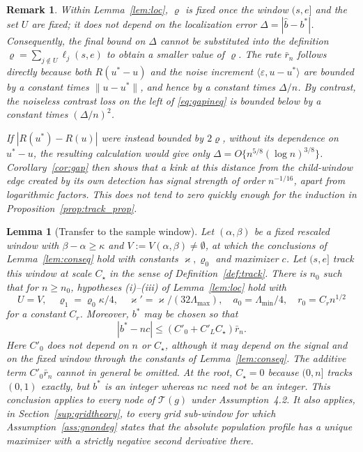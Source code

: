 \documentclass[12pt, a4paper]{article}
\newtheorem{lemma}{Lemma}[section]
\newtheorem{remark}{Remark}[section]
\newcommand{\assnondeg}{Assumption~4.2}
\begin{document}
\begin{remark}
\label{rem:fixedpoint}
Within Lemma~\ref{lem:loc}, $\varrho$ is fixed once the window $(s,e]$ and the
set $U$ are fixed; it does not depend on the localization error
$\Delta=|\hat b-b^*|$. Consequently, the final bound on $\Delta$ cannot be
substituted into the definition
$\varrho=\sum_{j\notin U}\ell_j(s,e)$ to obtain a smaller value of $\varrho$.
The rate $\bar r_n$ follows directly because both
$R(u^*-u)$ and the noise increment
$\langle\varepsilon,u-u^*\rangle$ are bounded by a constant times
$\|u-u^*\|$, and hence by a constant times $\Delta/n$. By contrast, the
noiseless contrast loss on the left of \eqref{eq:gapineq} is bounded below by
a constant times $(\Delta/n)^2$.

If $|R(u^*)-R(u)|$ were instead bounded by $2\varrho$, without its dependence
on $u^*-u$, the resulting calculation would give only
$\Delta=O\{n^{5/8}(\log n)^{3/8}\}$. Corollary~\ref{cor:gap} then shows that a
kink at this distance from the child-window edge created by its own detection
has signal strength of order $n^{-1/16}$, apart from logarithmic factors. This
does not tend to zero quickly enough for the induction in
Proposition~\ref{prop:track_prop}.
\end{remark}

\begin{lemma}[Transfer to the sample window]
\label{lem:transfer}
Let $(\alpha,\beta)$ be a fixed rescaled window with
$\beta-\alpha\ge\kappa$ and $V:=V(\alpha,\beta)\ne\emptyset$, at which the
conclusions of Lemma~\ref{lem:conseq} hold with constants
$\varkappa,\varrho_0$ and maximizer $c$. Let $(s,e]$ track this window at scale
$C_\star$ in the sense of Definition~\ref{def:track}. There is $n_0$ such that
for $n\ge n_0$, hypotheses (i)--(iii) of Lemma~\ref{lem:loc} hold with
\[
U=V,\quad \varrho_1=\varrho_0\kappa/4,\quad
\varkappa'=\varkappa/(32\Lambda_{\max}),\quad
a_0=\Lambda_{\min}/4,\quad r_0=C_rn^{1/2}
\]
for a constant $C_r$. Moreover, $b^*$ may be chosen so that
\[
|b^*-nc|\le(C'_0+C'_LC_\star)\bar r_n.
\]
Here $C'_0$ does not depend on $n$ or $C_\star$, although it may depend on the
signal and on the fixed window through the constants of
Lemma~\ref{lem:conseq}. The additive term $C'_0\bar r_n$ cannot in general be
omitted. At the root, $C_\star=0$ because $(0,n]$ tracks $(0,1)$ exactly, but
$b^*$ is an integer whereas $nc$ need not be an integer. This conclusion
applies to every node of $\mathcal T(g)$ under \assnondeg{}. It also applies,
in Section~\ref{sup:gridtheory}, to every grid sub-window for which
Assumption~\ref{ass:gnondeg} states that the absolute population profile has a
unique maximizer with a strictly negative second derivative there.
\end{lemma}
\end{document}
